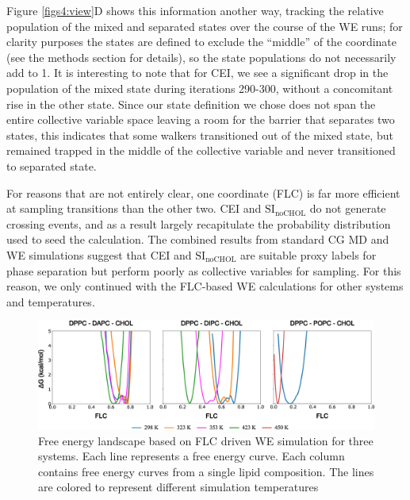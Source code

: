 \documentclass{biophys-new}
\begin{document}
Figure \ref{figs4:view}D shows this information another way, tracking the relative population of the mixed and separated states over the course of the WE runs; for clarity purposes the states are defined to exclude the ``middle'' of the coordinate (see the methods section for details), so the state populations do not necessarily add to 1.
It is interesting to note that for CEI, we see a significant drop in the population of the mixed state during iterations 290-300, without a concomitant rise in the other state.
Since our state definition we chose does not span the entire collective variable space leaving a room for the barrier that separates two states, this indicates that some walkers transitioned out of the mixed state, but remained trapped in the middle of the collective variable and never transitioned to separated state. 

For reasons that are not entirely clear, one coordinate (FLC) is far more efficient at sampling transitions than the other two. CEI and $\text{SI}_{\text{noCHOL}}$ do not generate crossing events, and as a result largely recapitulate the probability distribution used to seed the calculation.
The combined results from standard CG MD and WE simulations suggest that CEI and $\text{SI}_{\text{noCHOL}}$ are suitable proxy labels for phase separation but perform poorly as collective variables for sampling.
For this reason, we only continued with the FLC-based WE calculations for other systems and temperatures.


\begin{figure}[hbt!]
\centering
\includegraphics[width=1\linewidth]{Figures/Main/5/placeholder.jpg}
\caption{Free energy landscape based on FLC driven WE simulation for three systems. Each line represents a free energy curve. Each column contains free energy curves from a single lipid composition. The lines are colored to represent different simulation temperatures}
\label{figs5:view}
\end{figure}
\end{document}
